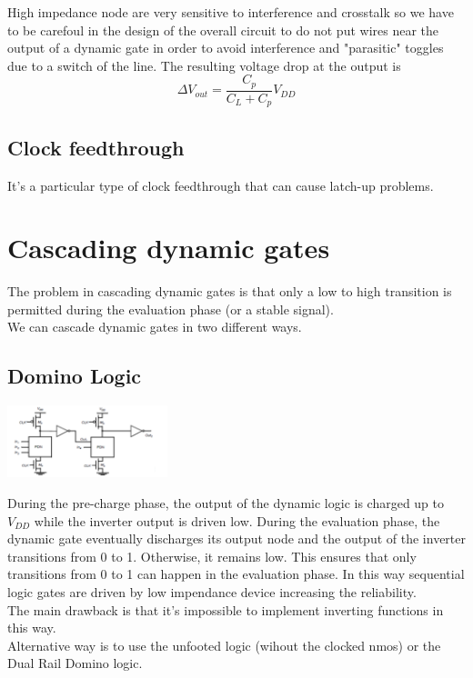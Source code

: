 High impedance node are very sensitive to interference and crosstalk so we have to be carefoul in the design of the overall circuit to do not put wires near the output of a dynamic gate in order to avoid interference and "parasitic" toggles due to a switch of the line.
The resulting voltage drop at the output is 
\begin{equation}
\Delta V_{out}=\frac{C_p}{C_L+C_p}V_{DD}
\end{equation}

\subsection{Clock feedthrough}
It's a particular type of clock feedthrough that can cause latch-up problems.\\


\section{Cascading dynamic gates}
The problem in cascading dynamic gates is that only a low to high transition is permitted during the evaluation phase (or a stable signal).\\
We can cascade dynamic gates in two different ways.

\subsection{Domino Logic}

\centering
\includegraphics[width=0.35\textwidth]{C9_7.png}\\
\raggedright

During the pre-charge phase, the output of the dynamic logic is charged up to $V_{DD}$ while the inverter output is driven low. During the evaluation phase, the dynamic gate eventually discharges its output node and the output of the inverter transitions from 0 to 1. Otherwise, it remains low. This ensures that only transitions from 0 to 1 can happen in the evaluation phase.
In this way sequential logic gates are driven by low impendance device increasing the reliability.\\
The main drawback is that it's impossible to implement inverting functions in this way.\\
\vspace{5mm}
Alternative way is to use the unfooted logic (wihout the clocked nmos) or the Dual Rail Domino logic.\\

